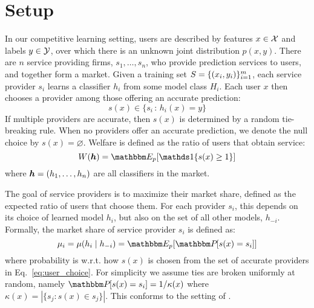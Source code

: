 \section{Setup}
\label{sec:setup}
In our competitive learning setting,
users are described by features $x \in {\cal{X}}$ and labels $y \in {\cal{Y}}$,
over which there is an unknown joint distribution $p(x,y)$.
There are $n$ service providing firms, $s_1,\dots,s_n$,
who provide prediction services to users, and together form a market.
Given a training set ${S}=\{(x_i,y_i)\}_{i=1}^m$,
each service provider $s_i$ learns a classifier $h_i$ from some model class $H_i$.
Each user $x$ then chooses a provider among those offering an accurate prediction:
\squeeze
\begin{equation}
\label{eq:user_choice}
s(x)
\in \{ s_i \,:\, h_i(x)=y \}
\end{equation}
If multiple providers are accurate,
then $s(x)$ is determined by a random tie-breaking rule.
When no providers offer an accurate prediction, we denote the null choice by
$s(x)=\varnothing$.
Welfare is defined as the ratio of users that obtain service:
\begin{equation}
\label{eq:welfare}
\welf(\h) = \expect{p}{\one{s(x) \ge 1}}
\end{equation}
where ${\bm{h}} = (h_1,\dots,h_n)$ are all classifiers in the market.
\squeeze

The goal of service providers is to maximize their market share,
defined as the expected ratio of users that choose them.
For each provider $s_i$,
this depends on its choice of learned model $h_i$,
but also on the set of all other models, $h_{-i}$.
Formally, the market share of service provider $s_i$ is defined as:
\squeeze
\begin{equation}
\label{eq:sp_utility_exp}
\ms_i = \ms(h_i \mid h_{-i})
= \expect{p}{\prob{}{s(x)=s_i}}
\end{equation}
where probability is w.r.t. how $s(x)$ is chosen from the set of accurate providers in Eq.~\eqref{eq:user_choice}.
For simplicity we assume ties are broken uniformly at random,
namely $\prob{}{s(x)=s_i} = 1 / \kappa(x)$ where 
$\kappa(x)=|\{s_j : s(x) \in s_j \}|$.
This conforms to the setting of \citet{ben2017best,ben2019regression}.

